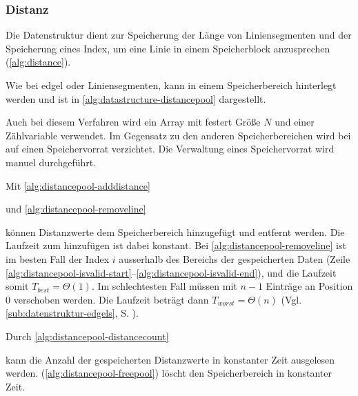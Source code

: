 \subsubsection{Distanz} %
\label{sub:distanz}

Die Datenstruktur  dient zur Speicherung der Länge von Liniensegmenten und der Speicherung eines
 Index, um eine Linie in einem Speicherblock anzusprechen (\autoref{alg:distance}).


Wie bei \gls{edgel} oder Liniensegmenten, kann  in einem Speicherbereich hinterlegt werden und ist
 in \autoref{alg:datastructure-distancepool} dargestellt.

Auch bei diesem Verfahren wird ein Array mit festert Größe $N$ und einer Zählvariable verwendet. Im Gegensatz zu den
 anderen Speicherbereichen wird bei  auf einen Speichervorrat verzichtet. Die Verwaltung eines
 Speichervorrat wird manuel durchgeführt.

Mit \autoref{alg:distancepool-adddistance}

 und \autoref{alg:distancepool-removeline}

 können Distanzwerte dem Speicherbereich hinzugefügt und entfernt werden. Die Laufzeit zum hinzufügen ist dabei
 konstant. Bei \autoref{alg:distancepool-removeline} ist im besten Fall der Index $i$ ausserhalb des Bereichs der
 gespeicherten Daten (Zeile \ref{alg:distancepool-isvalid-start}--\ref{alg:distancepool-isvalid-end}), und die Laufzeit
 somit $T_{best}=\Theta(1)$. Im schlechtesten Fall müssen mit  $n-1$ Einträge an Position $0$
 verschoben werden. Die Laufzeit beträgt dann
 $T_{worst}=\Theta(n)$ (Vgl. \autoref{sub:datenstruktur-edgels}, S. \pageref{sub:datenstruktur-edgels-memmove}).

Durch \autoref{alg:distancepool-distancecount}

 kann die Anzahl der gespeicherten Distanzwerte in konstanter Zeit ausgelesen werden. 
(\autoref{alg:distancepool-freepool}) löscht den Speicherbereich in konstanter Zeit.


